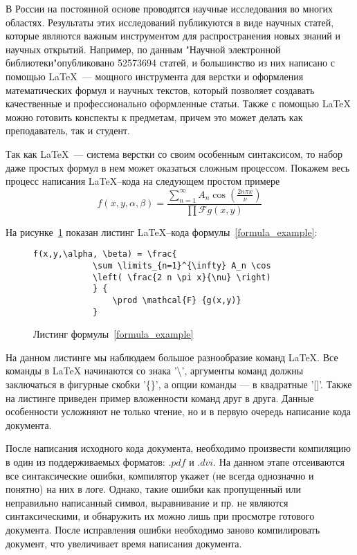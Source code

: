 \introduction %

В России на постоянной основе проводятся научные исследования во многих областях. Результаты этих исследований публикуются в виде научных статей, которые являются важным инструментом для распространения новых знаний и научных открытий.
Например, по данным "Научной электронной библиотеки"\;опубликовано 52573694 \cite{eLib} статей, и большинство из них написано с помощью \LaTeX ~--- мощного инструмента для верстки и оформления математических формул и научных текстов, который позволяет создавать качественные и профессионально оформленные статьи. 
Также с помощью \LaTeX\; можно готовить конспекты к предметам, причем это может делать как преподаватель, так и студент.

Так как \LaTeX ~--- система верстки со своим особенным синтаксисом, то набор даже простых формул в нем может оказаться сложным процессом. Покажем весь процесс написания \LaTeX--кода на следующем простом примере
\begin{equation}
    \label{formula_example}
        f(x,y,\alpha, \beta) = \frac{\sum \limits_{n=1}^{\infty} 
        A_n \cos \left( \frac{2 n \pi x}{\nu} \right)} {\prod \mathcal{F} {g(x,y)} } 
\end{equation}

На рисунке~\ref{formula_listing} показан листинг \LaTeX--кода формулы~\ref{formula_example}:

\begin{figure}
    \begin{lstlisting}[language={[LaTeX]Tex}]
        f(x,y,\alpha, \beta) = \frac{
            \sum \limits_{n=1}^{\infty} A_n \cos 
            \left( \frac{2 n \pi x}{\nu} \right)
            } {
                \prod \mathcal{F} {g(x,y)} 
            } 
    \end{lstlisting}
    \caption{Листинг формулы~\ref{formula_example}}
    \label{formula_listing}
\end{figure}

На данном листинге мы наблюдаем большое разнообразие команд \LaTeX. 
Все команды в \LaTeX\; начинаются со знака '\textbackslash', аргументы команд должны заключаться в фигурные скобки '\{\}',
а опции команды --- в квадратные '[]'. Также на листинге приведен пример вложенности команд друг в друга. 
Данные особенности усложняют не только чтение, но и в первую очередь написание кода документа.

После написания исходного кода документа, необходимо произвести компиляцию в один из поддерживаемых форматов: $\textit{.pdf}$ и $\textit{.dvi}$. 
На данном этапе отсеиваются все синтаксические ошибки, компилятор укажет (не всегда однозначно и понятно) на них в логе. 
Однако, такие ошибки как пропущенный или неправильно написанный символ, выравнивание и пр. не являются синтаксическими, и обнаружить их можно лишь при просмотре готового документа. 
После исправления ошибки необходимо заново компилировать документ, что увеличивает время написания документа.

